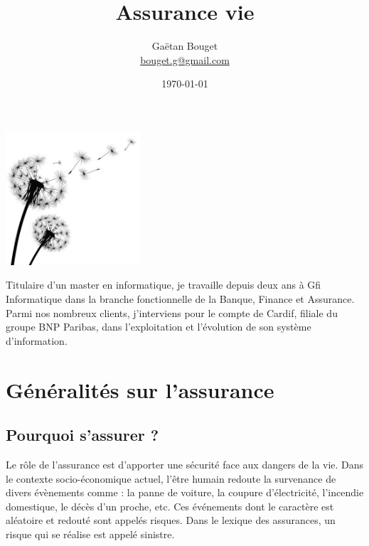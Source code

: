 \documentclass{article}
\title{Assurance vie}
\author{Gaëtan Bouget \\ \href{mailto:bouget.g@gmail.com}{bouget.g@gmail.com}}
\date{\today}
\begin{document}
\maketitle
\thispagestyle{empty}

\vspace{3cm}

\begin{center}
    \includegraphics[width=5cm]{dandelion.jpg}
\end{center}

\vspace{3cm}

Titulaire d'un master en informatique, je travaille depuis deux ans à Gfi Informatique dans la branche fonctionnelle de la Banque, Finance et Assurance. Parmi nos nombreux clients, j'interviens pour le compte de Cardif, filiale du groupe BNP Paribas, dans l'exploitation et l'évolution de son système d'information.

\newpage

\tableofcontents

\newpage

\section{Généralités sur l'assurance}

\subsection{Pourquoi s'assurer ?}
Le rôle de l'assurance est d'apporter une sécurité face aux dangers de la vie. Dans le contexte socio-économique actuel, l'être humain redoute la survenance de divers évènements comme : la panne de voiture, la coupure d'électricité, l'incendie domestique, le décès d'un proche, etc. Ces événements dont le caractère est aléatoire et redouté sont appelés risques. Dans le lexique des assurances, un risque qui se réalise est appelé sinistre.
\end{document}

